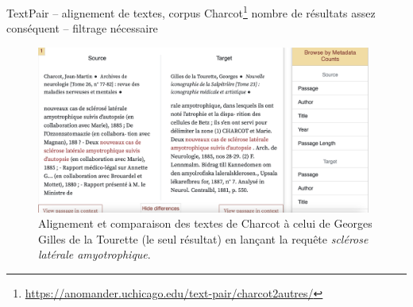 \begin{frame}{TextPair -- alignement de textes, corpus Charcot\footnote{\url{https://anomander.uchicago.edu/text-pair/charcot2autres/}}}
\danger nombre de
résultats assez conséquent -- filtrage nécessaire
    \begin{figure}[!ht]
        \centering
        \includegraphics[width=110mm,scale=0.5]{pic/textpair.png}
        \caption{Alignement et comparaison des textes de
Charcot à celui de Georges Gilles de la Tourette (le seul
résultat) en lançant la requête \textit{sclérose latérale
amyotrophique}.}
        \label{fig:enter-label}
    \end{figure}
\end{frame}



